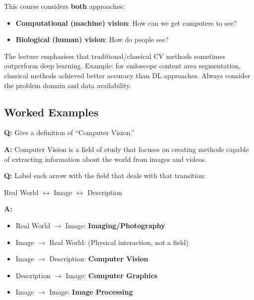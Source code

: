 This course considers \textbf{both} approaches:
\begin{itemize}
  \item \textbf{Computational (machine) vision}: How can we get computers to see?
  \item \textbf{Biological (human) vision}: How do people see?
\end{itemize}

\begin{tipbox}
The lecture emphasises that traditional/classical CV methods sometimes outperform deep learning. Example: for endoscope content area segmentation, classical methods achieved better accuracy than DL approaches. Always consider the problem domain and data availability.
\end{tipbox}

\bigseparator

\subsection{Worked Examples}

\begin{exbox}
\textbf{Q:} Give a definition of ``Computer Vision.''

\textbf{A:} Computer Vision is a field of study that focuses on creating methods capable of extracting information about the world from images and videos.
\end{exbox}

\begin{exbox}
\textbf{Q:} Label each arrow with the field that deals with that transition:
\begin{center}
Real World $\leftrightarrow$ Image $\leftrightarrow$ Description
\end{center}

\textbf{A:}
\begin{itemize}
  \item Real World $\rightarrow$ Image: \textbf{Imaging/Photography}
  \item Image $\rightarrow$ Real World: (Physical interaction, not a field)
  \item Image $\rightarrow$ Description: \textbf{Computer Vision}
  \item Description $\rightarrow$ Image: \textbf{Computer Graphics}
  \item Image $\rightarrow$ Image: \textbf{Image Processing}
\end{itemize}
\end{exbox}

